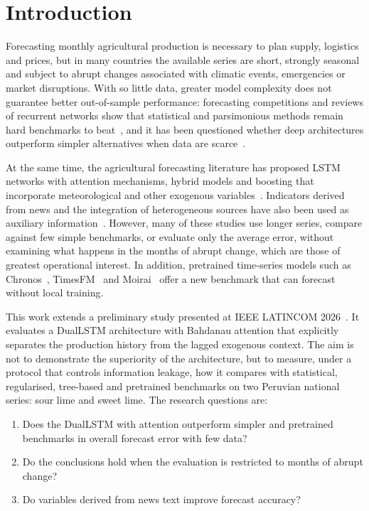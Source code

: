 \documentclass[forecasting,article,submit,moreauthors]{Definitions/mdpi}
\begin{document}
\section{Introduction}

Forecasting monthly agricultural production is necessary to plan supply, logistics and prices, but in many countries the available series are short, strongly seasonal and subject to abrupt changes associated with climatic events, emergencies or market disruptions. With so little data, greater model complexity does not guarantee better out-of-sample performance: forecasting competitions and reviews of recurrent networks show that statistical and parsimonious methods remain hard benchmarks to beat~\cite{makridakis2020m4,makridakis2022m5,hewamalage2021rnn,lim2021timeseries}, and it has been questioned whether deep architectures outperform simpler alternatives when data are scarce~\cite{rather2024breaking,hewamalage2023forecast}.

At the same time, the agricultural forecasting literature has proposed LSTM networks with attention mechanisms, hybrid models and boosting that incorporate meteorological and other exogenous variables~\cite{gu2022forecasting,yin2020stl,bao2025study,manogna2025enhancing,choudhary2025genetic,sediyono2025integrated,ray2024arima,avinash2024hidden,nayak2024exogenous,zhao2025hybrid,chandan2025exogenous,celik2025hybrid}. Indicators derived from news and the integration of heterogeneous sources have also been used as auxiliary information~\cite{lukauskas2022economic,chong2022using,liapis2023investigating,du2024financial,rosa2025brazilian}. However, many of these studies use longer series, compare against few simple benchmarks, or evaluate only the average error, without examining what happens in the months of abrupt change, which are those of greatest operational interest. In addition, pretrained time-series models such as Chronos~\cite{ansari2024chronos}, TimesFM~\cite{das2024decoder} and Moirai~\cite{woo2024unified} offer a new benchmark that can forecast without local training.

This work extends a preliminary study presented at IEEE LATINCOM 2026~\cite{sanchez2026latincom}. It evaluates a DualLSTM architecture with Bahdanau attention that explicitly separates the production history from the lagged exogenous context. The aim is not to demonstrate the superiority of the architecture, but to measure, under a protocol that controls information leakage, how it compares with statistical, regularised, tree-based and pretrained benchmarks on two Peruvian national series: sour lime and sweet lime. The research questions are:
\begin{enumerate}
\item Does the DualLSTM with attention outperform simpler and pretrained benchmarks in overall forecast error with few data?
\item Do the conclusions hold when the evaluation is restricted to months of abrupt change?
\item Do variables derived from news text improve forecast accuracy?
\end{enumerate}
\end{document}

